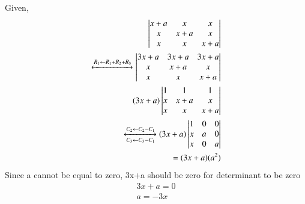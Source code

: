 Given,
\begin{align}
\begin{vmatrix}x+a & x & x\\x & x+a & x\\x& x & x+a\end{vmatrix}
\\
\xleftrightarrow[]{R_1\leftarrow R_1+R_2+R_3}\begin{vmatrix}3x+a & 3x+a & 3x+a \\x & x+a & x\\ x & x & x+a\end{vmatrix}
\\
(3x+a)\begin{vmatrix}1 & 1 & 1 \\x & x+a & x\\ x & x & x+a\end{vmatrix}
\\
\xleftrightarrow[C_3\leftarrow C_3-C_1]{C_2\leftarrow C_2-C_1}(3x+a)\begin{vmatrix}1 & 0 & 0 \\x & a & 0\\ x & 0 & a\end{vmatrix} 
\\
= (3x+a)(a^2)
\end{align}
Since a cannot be equal to zero, 3x+a should be zero for determinant to be zero
\begin{align}
3x + a = 0
\\
a = -3x
\end{align}

